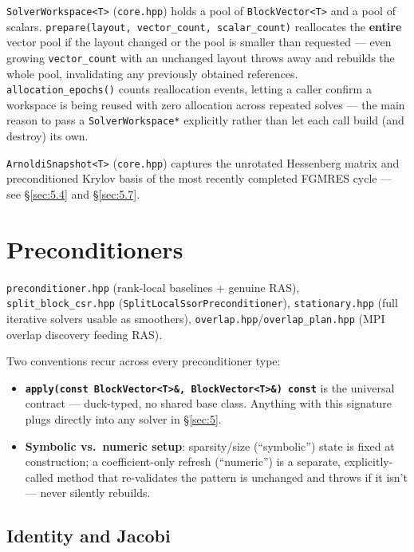\documentclass[11pt,a4paper]{report}
\newcommand{\secref}[1]{\S\ref{#1}}
\begin{document}
\lstinline!SolverWorkspace<T>! (\texttt{core.hpp}) holds a pool of
\lstinline!BlockVector<T>! and a pool of scalars.
\lstinline!prepare(layout, vector_count, scalar_count)! reallocates the
\textbf{entire} vector pool if the layout changed or the pool is
smaller than requested --- even growing \lstinline!vector_count! with an
unchanged layout throws away and rebuilds the whole pool, invalidating
any previously obtained references. \lstinline!allocation_epochs()! counts
reallocation events, letting a caller confirm a workspace is being
reused with zero allocation across repeated solves --- the main reason
to pass a \lstinline!SolverWorkspace*! explicitly rather than let each call
build (and destroy) its own.

\lstinline!ArnoldiSnapshot<T>! (\texttt{core.hpp}) captures the unrotated
Hessenberg matrix and preconditioned Krylov basis of the most recently
completed FGMRES cycle --- see \secref{sec:5.4} and \secref{sec:5.7}.

\chapter{Preconditioners}
\label{sec:6}

\texttt{preconditioner.hpp} (rank-local baselines + genuine RAS),
\texttt{split\_block\_csr.hpp} (\lstinline!SplitLocalSsorPreconditioner!),
\texttt{stationary.hpp} (full iterative solvers usable as smoothers),
\texttt{overlap.hpp}/\texttt{overlap\_plan.hpp} (MPI overlap discovery
feeding RAS).

Two conventions recur across every preconditioner type:

\begin{itemize}
\item \textbf{\lstinline!apply(const BlockVector<T>&, BlockVector<T>&) const!}
  is the universal contract --- duck-typed, no shared base class.
  Anything with this signature plugs directly into any solver in
  \secref{sec:5}.
\item \textbf{Symbolic vs.\ numeric setup}: sparsity/size (``symbolic'')
  state is fixed at construction; a coefficient-only refresh
  (``numeric'') is a separate, explicitly-called method that
  re-validates the pattern is unchanged and throws if it isn't ---
  never silently rebuilds.
\end{itemize}

\section{Identity and Jacobi}
\label{sec:6.1}
\end{document}

